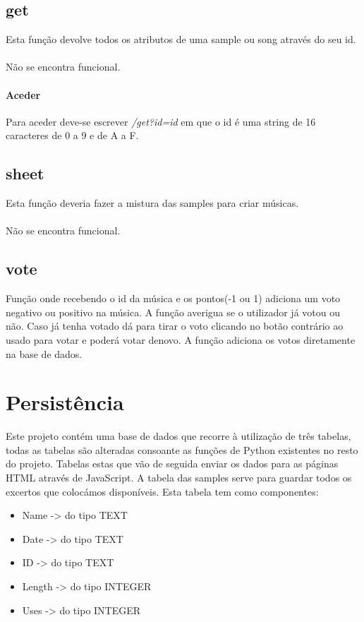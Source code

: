 \documentclass{report}
\begin{document}
 \subsection{get}
 Esta função devolve todos os atributos de uma sample ou song através do seu id.
 \paragraph{} Não se encontra funcional.
 \paragraph{Aceder} 
 Para aceder deve-se escrever \textit{/get?id=id} em que o id é uma string de 16 caracteres de 0 a 9 e de A a F.

 \subsection{sheet}
 Esta função deveria fazer a mistura das samples para criar músicas.
 \paragraph{} Não se encontra funcional.

 \subsection{vote}
Função onde recebendo o id da música e os pontos(-1 ou 1) adiciona 
um voto negativo ou positivo na música.
A função averigua se o utilizador já votou ou não. Caso já tenha votado
dá para tirar o voto clicando no botão contrário ao usado para votar e
poderá votar denovo.
A função adiciona os votos diretamente na base de dados.



\section{Persistência}
\label{chap.persistencia}
Este projeto contém uma base de dados que recorre à utilização de três tabelas, todas as tabelas são alteradas consoante as funções de Python existentes no resto do projeto.
Tabelas estas que vão de seguida enviar os dados para as páginas HTML através de JavaScript.
A tabela das samples serve para guardar todos os excertos que colocámos disponíveis.
Esta tabela tem como componentes:
	\begin{itemize}
		\item Name   -> do tipo TEXT
		\item Date   -> do tipo TEXT
		\item ID     -> do tipo TEXT
		\item Length -> do tipo INTEGER
		\item Uses   -> do tipo INTEGER
	\end{itemize}
\end{document}
